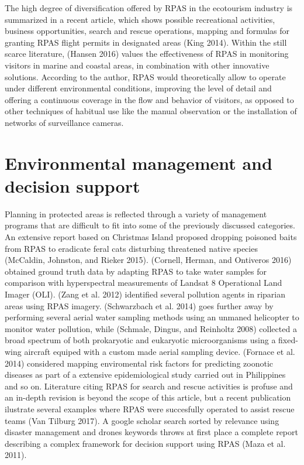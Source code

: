 \documentclass[]{interact}
\theoremstyle{plain}%
\theoremstyle{definition}
\theoremstyle{remark}
\begin{document}
The high degree of diversification offered by RPAS in the ecotourism
industry is summarized in a recent article, which shows possible
recreational activities, business opportunities, search and rescue
operations, mapping and formulas for granting RPAS flight permits in
designated areas (King 2014). Within the still scarce literature,
(Hansen 2016) values the effectiveness of RPAS in monitoring visitors in
marine and coastal areas, in combination with other innovative
solutions. According to the author, RPAS would theoretically allow to
operate under different environmental conditions, improving the level of
detail and offering a continuous coverage in the flow and behavior of
visitors, as opposed to other techniques of habitual use like the manual
observation or the installation of networks of surveillance cameras.

\section{Environmental management and decision
support}\label{environmental-management-and-decision-support}

Planning in protected areas is reflected through a variety of management
programs that are difficult to fit into some of the previously discussed
categories. An extensive report based on Christmas Island proposed
dropping poisoned baits from RPAS to eradicate feral cats disturbing
threatened native species (McCaldin, Johnston, and Rieker 2015).
(Cornell, Herman, and Ontiveros 2016) obtained ground truth data by
adapting RPAS to take water samples for comparison with hyperspectral
measurements of Landsat 8 Operational Land Imager (OLI). (Zang et al.
2012) identified several pollution agents in riparian areas using RPAS
imagery. (Schwarzbach et al. 2014) goes further away by performing
several aerial water sampling methods using an unmaned helicopter to
monitor water pollution, while (Schmale, Dingus, and Reinholtz 2008)
collected a broad spectrum of both prokaryotic and eukaryotic
microorganisms using a fixed-wing aircraft equiped with a custom made
aerial sampling device. (Fornace et al. 2014) considered mapping
enviromental risk factors for predicting zoonotic diseases as part of a
extensive epidemiological study carried out in Philippines and so on.
Literature citing RPAS for search and rescue activities is profuse and
an in-depth revision is beyond the scope of this article, but a recent
publication ilustrate several examples where RPAS were succesfully
operated to assist rescue teams (Van Tilburg 2017). A google scholar
search sorted by relevance using disaster management and drones keywords
throws at first place a complete report describing a complex framework
for decision support using RPAS (Maza et al. 2011).
\end{document}
